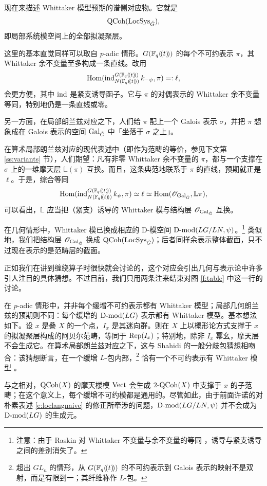 \ssszh 现在来描述 Whittaker 模型预期的谱侧对应物。它就是 $$\operatorname{QCoh}(\operatorname{LocSys}_{\check{G}}),$$ 即局部系统模空间上的全部拟凝聚层。

这里的基本直觉同样可以取自 $p$-adic 情形。$G(\mathbb{F}_q(\!(t)\!))$ 的每个不可约表示 $\pi$，其 Whittaker 余不变量至多构成一条直线。改用
\[
\operatorname{Hom}( \operatorname{ind}_{N(\mathbb{F}_q(\!(t)\!))}^{G(\mathbb{F}_q(\!(t)\!))} k_{-\psi}, \pi) =: \ell,
\]
会更方便，其中 $\operatorname{ind}$ 是紧支诱导函子。它与 $\pi$ 的对偶表示的 Whittaker 余不变量等同，特别地仍是一条直线或零。

另一方面，在局部朗兰兹对应之下，人们给 $\pi$ 配上一个 Galois 表示 $\sigma$，并把 $\pi$ 想象成在 Galois 表示的空间 $\operatorname{Gal}_{\check{G}}$ 中「坐落于 $\sigma$ 之上」。

在算术局部朗兰兹对应的现代表述中（即作为范畴的等价，参见下文第 \ref{ss:variants} 节），人们期望：凡有非零 Whittaker 余不变量的 $\pi$，都与一个支撑在 $\sigma$ 上的一维摩天层 $\mathbb{L}(\pi)$ 互换。而且，这条典范地联系于 $\pi$ 的直线，预期就正是 $\ell$。于是，综合等同
\[
\operatorname{Hom}( \operatorname{ind}_{N(\mathbb{F}_q(\!(t)\!))}^{G(\mathbb{F}_q(\!(t)\!))} k_\psi, \pi) \simeq \ell \simeq
\operatorname{Hom}( \mathscr{O}_{\operatorname{Gal}_{\check{G}}},  \mathbb{L} \pi ),
\]
可以看出，$\mathbb{L}$ 应当把（紧支）诱导的 Whittaker 模与结构层 $\mathscr{O}_{\operatorname{Gal}_{\check{G}}}$ 互换。

在几何情形中，Whittaker 模已换成相应的 D-模空间 $\operatorname{D-mod}(LG/LN,\psi)$。\footnote{注意：由于 Raskin 对 Whittaker 不变量与余不变量的等同 \cite{whit}，诱导与紧支诱导之间的差别消失了。} 类似地，我们把结构层 $\mathscr{O}_{\operatorname{Gal}_{\check{G}}}$ 换成 $\operatorname{QCoh}(\operatorname{LocSys}_{\check{G}})$；后者同样余表示整体截面，只不过现在表示的是范畴层的截面。

正如我们在讲到缠绕算子时很快就会讨论的，这个对应会引出几何与表示论中许多引人注目的具体猜想。不过目前，我们只用两条注来结束对图 \ref{f:table} 中这一行的讨论。

\begin{re} 在 $p$-adic 情形中，并非每个缓增不可约表示都有 Whittaker 模型；局部几何朗兰兹的预期则不同：每个缓增的 $\operatorname{D-mod}(LG)$ 表示都有 Whittaker 模型。基本想法如下。设 $x$ 是叠 $X$ 的一个点，$I_x$ 是其迷向群。则在 $X$ 上以概形论方式支撑于 $x$ 的拟凝聚层构成的阿贝尔范畴，等同于 $\operatorname{Rep}(I_x)$；特别地，除非 $I_x$ 幂幺，摩天层不会生成它。在算术局部朗兰兹对应之下，这与 Shahidi 的一般分歧包猜想相吻合：该猜想断言，在一个缓增 $L$-包内部，\footnote{超出 $GL_n$ 的情形，从 $G(\mathbb{F}_q(\!(t)\!))$ 的不可约表示到 Galois 表示的映射不是双射，而是有限到一；其纤维称作 $L$-包。} 恰有一个不可约表示有 Whittaker 模型 \cite{shahidi90}。

与之相对，$\operatorname{QCoh}(X)$ 的摩天楼模 $\operatorname{Vect}$ 会生成 $\operatorname{2-QCoh}(X)$ 中支撑于 $x$ 的子范畴；在这个意义上，每个缓增不可约模都是通用的。尽管如此，由于前面许诺的对朴素表述 \eqref{e:loclangnaive} 的修正所牵涉的问题，$\operatorname{D-mod}(LG/LN, \psi)$ 并不会成为 $\operatorname{D-mod}(LG)$ 的生成元。
\end{re}
